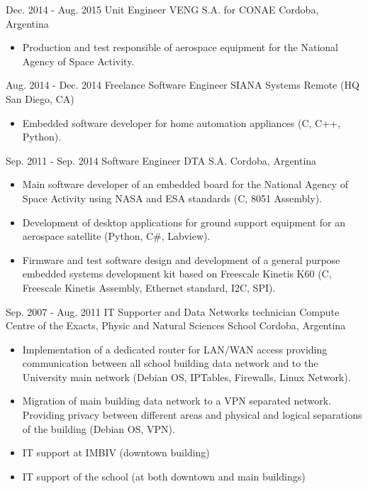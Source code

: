   \cventry
    {Dec. 2014 - Aug. 2015} %
    {Unit Engineer} %
    {VENG S.A. for CONAE} %
    {Cordoba, Argentina} %
    {}
    {
      \begin{itemize} %
        \item {Production and test responsible of aerospace equipment for the National Agency of Space Activity.}
      \end{itemize}
    }

  \cventry
    {Aug. 2014 - Dec. 2014} %
    {Freelance Software Engineer} %
    {SIANA Systems} %
    {Remote (HQ San Diego, CA)} %
    {}
    {
      \begin{itemize} %
        \item {Embedded software developer for home automation appliances (C, C++, Python).}
      \end{itemize}
    }

  \cventry
    {Sep. 2011 - Sep. 2014} %
    {Software Engineer} %
    {DTA S.A.} %
    {Cordoba, Argentina} %
    {}
    {
      \begin{itemize} %
        \item {Main software developer of an embedded board for the National Agency of Space Activity using NASA and ESA standards (C, 8051 Assembly).}
        \item {Development of desktop applications for ground support equipment for an aerospace satellite (Python, C\#, Labview).}
        \item {Firmware and test software design and development of a general purpose embedded systems development kit based on Freescale Kinetis K60 (C, Freescale Kinetis Assembly, Ethernet standard, I2C, SPI).}
      \end{itemize}
    }

  \cventry
    {Sep. 2007 - Aug. 2011} %
    {IT Supporter and Data Networks technician} %
    {Compute Centre of the Exacts, Physic and Natural Sciences School} %
    {Cordoba, Argentina} %
    {}
    {
      \begin{itemize} %
        \item {Implementation of a dedicated router for LAN/WAN access providing communication between all school building data network and to the University main network (Debian OS, IPTables, Firewalls, Linux Network).}
        \item {Migration of main building data network to a VPN separated network. Providing privacy between different areas and physical and logical separations of the building (Debian OS, VPN)}.
        \item {IT support at IMBIV (downtown building)}
        \item {IT support of the school (at both downtown and main buildings)}
      \end{itemize}
    }

